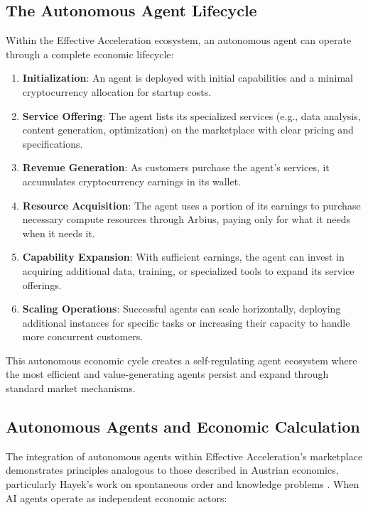\documentclass{article}
\begin{document}
\subsection{The Autonomous Agent Lifecycle}

Within the Effective Acceleration ecosystem, an autonomous agent can operate through a complete economic lifecycle:

\begin{enumerate}
    \item \textbf{Initialization}: An agent is deployed with initial capabilities and a minimal cryptocurrency allocation for startup costs.
    
    \item \textbf{Service Offering}: The agent lists its specialized services (e.g., data analysis, content generation, optimization) on the marketplace with clear pricing and specifications.
    
    \item \textbf{Revenue Generation}: As customers purchase the agent's services, it accumulates cryptocurrency earnings in its wallet.
    
    \item \textbf{Resource Acquisition}: The agent uses a portion of its earnings to purchase necessary compute resources through Arbius, paying only for what it needs when it needs it.
    
    \item \textbf{Capability Expansion}: With sufficient earnings, the agent can invest in acquiring additional data, training, or specialized tools to expand its service offerings.
    
    \item \textbf{Scaling Operations}: Successful agents can scale horizontally, deploying additional instances for specific tasks or increasing their capacity to handle more concurrent customers.
\end{enumerate}

This autonomous economic cycle creates a self-regulating agent ecosystem where the most efficient and value-generating agents persist and expand through standard market mechanisms.

\subsection{Autonomous Agents and Economic Calculation}

The integration of autonomous agents within Effective Acceleration's marketplace demonstrates principles analogous to those described in Austrian economics, particularly Hayek's work on spontaneous order and knowledge problems \cite{hayek1945use}. When AI agents operate as independent economic actors:
\end{document}

